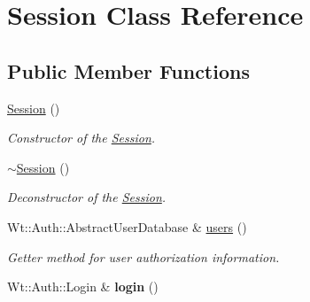\hypertarget{classSession}{}\section{Session Class Reference}
\label{classSession}
\subsection*{Public Member Functions}
\begin{DoxyCompactItemize}
\item 
\hyperlink{classSession_ad92ef09b872c9227e38a6efdd4d8a837}{Session} ()
\begin{DoxyCompactList}\small\item\em Constructor of the \hyperlink{classSession}{Session}. \end{DoxyCompactList}\item 
\hyperlink{classSession_a8753bb9dee966b7d39abc9b7237cd665}{$\sim$\+Session} ()
\begin{DoxyCompactList}\small\item\em Deconstructor of the \hyperlink{classSession}{Session}. \end{DoxyCompactList}\item 
Wt\+::\+Auth\+::\+Abstract\+User\+Database \& \hyperlink{classSession_af91c8b22a14acf05e46265698deb8af4}{users} ()
\begin{DoxyCompactList}\small\item\em Getter method for user authorization information. \end{DoxyCompactList}\item 
Wt\+::\+Auth\+::\+Login \& {\bfseries login} ()\hypertarget{classSession_ac9b69619756936d8f27bc6702c334b1f}{}\label{classSession_ac9b69619756936d8f27bc6702c334b1f}


\end{DoxyCompactItemize}
